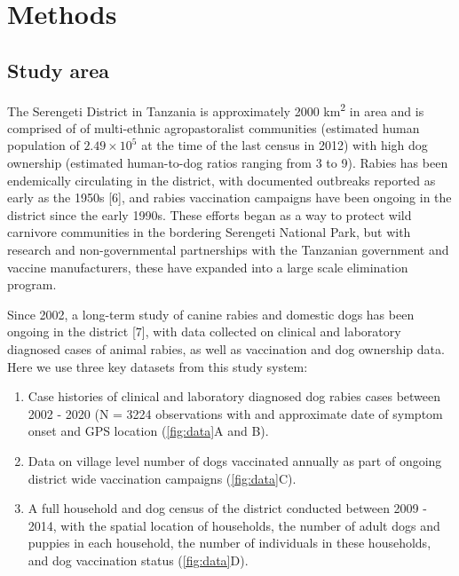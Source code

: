 \documentclass[
]{book}
\begin{document}
\hypertarget{methods-2}{%
\section{Methods}\label{methods-2}}

\hypertarget{study-area}{%
\subsection{Study area}\label{study-area}}

The Serengeti District in Tanzania is approximately 2000 km\textsuperscript{2} in area and is comprised of of multi-ethnic agropastoralist communities (estimated human population of \ensuremath{2.49\times 10^{5}} at the time of the last census in 2012) with high dog ownership (estimated human-to-dog ratios ranging from 3 to 9). Rabies has been endemically circulating in the district, with documented outbreaks reported as early as the 1950s {[}6{]}, and rabies vaccination campaigns have been ongoing in the district since the early 1990s. These efforts began as a way to protect wild carnivore communities in the bordering Serengeti National Park, but with research and non-governmental partnerships with the Tanzanian government and vaccine manufacturers, these have expanded into a large scale elimination program.

Since 2002, a long-term study of canine rabies and domestic dogs has been ongoing in the district {[}7{]}, with data collected on clinical and laboratory diagnosed cases of animal rabies, as well as vaccination and dog ownership data. Here we use three key datasets from this study system:

\begin{enumerate}
\def\labelenumi{\arabic{enumi})}
\item
  Case histories of clinical and laboratory diagnosed dog rabies cases between 2002 - 2020 (N = 3224 observations with and approximate date of symptom onset and GPS location (\ref{fig:data}A and B).
\item
  Data on village level number of dogs vaccinated annually as part of ongoing district wide vaccination campaigns (\ref{fig:data}C).
\item
  A full household and dog census of the district conducted between 2009 - 2014, with the spatial location of households, the number of adult dogs and puppies in each household, the number of individuals in these households, and dog vaccination status (\ref{fig:data}D).
\end{enumerate}
\end{document}
